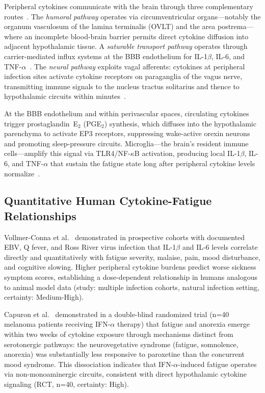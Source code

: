 Peripheral cytokines communicate with the brain through three complementary routes~\cite{Dantzer2000neural, McCusker2013}. The \emph{humoral pathway} operates via circumventricular organs---notably the organum vasculosum of the lamina terminalis (OVLT) and the area postrema---where an incomplete blood-brain barrier permits direct cytokine diffusion into adjacent hypothalamic tissue. A \emph{saturable transport pathway} operates through carrier-mediated influx systems at the BBB endothelium for IL-1$\beta$, IL-6, and TNF-$\alpha$~\cite{McCusker2013}. The \emph{neural pathway} exploits vagal afferents: cytokines at peripheral infection sites activate cytokine receptors on paraganglia of the vagus nerve, transmitting immune signals to the nucleus tractus solitarius and thence to hypothalamic circuits within minutes~\cite{Dantzer2000neural, Huerta2025vagal}.

At the BBB endothelium and within perivascular spaces, circulating cytokines trigger prostaglandin~E$_2$ (PGE$_2$) synthesis, which diffuses into the hypothalamic parenchyma to activate EP3 receptors, suppressing wake-active orexin neurons and promoting sleep-pressure circuits. Microglia---the brain's resident immune cells---amplify this signal via TLR4/NF-$\kappa$B activation, producing local IL-1$\beta$, IL-6, and TNF-$\alpha$ that sustain the fatigue state long after peripheral cytokine levels normalize~\cite{McCusker2013}.

\subsection{Quantitative Human Cytokine-Fatigue Relationships}

\begin{observation}
\label{obs:cytokine-fatigue-correlation}
Vollmer-Conna et al.~\cite{VollmerConna2004} demonstrated in prospective cohorts with documented EBV, Q fever, and Ross River virus infection that IL-1$\beta$ and IL-6 levels correlate directly and quantitatively with fatigue severity, malaise, pain, mood disturbance, and cognitive slowing. Higher peripheral cytokine burdens predict worse sickness symptom scores, establishing a dose-dependent relationship in humans analogous to animal model data (study: multiple infection cohorts, natural infection setting, certainty: Medium-High).
\end{observation}

\begin{observation}
\label{obs:ifn-alpha-fatigue-rct}
Capuron et al.~\cite{Capuron2002} demonstrated in a double-blind randomized trial (n=40 melanoma patients receiving IFN-$\alpha$ therapy) that fatigue and anorexia emerge within two weeks of cytokine exposure through mechanisms distinct from serotonergic pathways: the neurovegetative syndrome (fatigue, somnolence, anorexia) was substantially less responsive to paroxetine than the concurrent mood syndrome. This dissociation indicates that IFN-$\alpha$-induced fatigue operates via non-monoaminergic circuits, consistent with direct hypothalamic cytokine signaling (RCT, n=40, certainty: High).
\end{observation}

